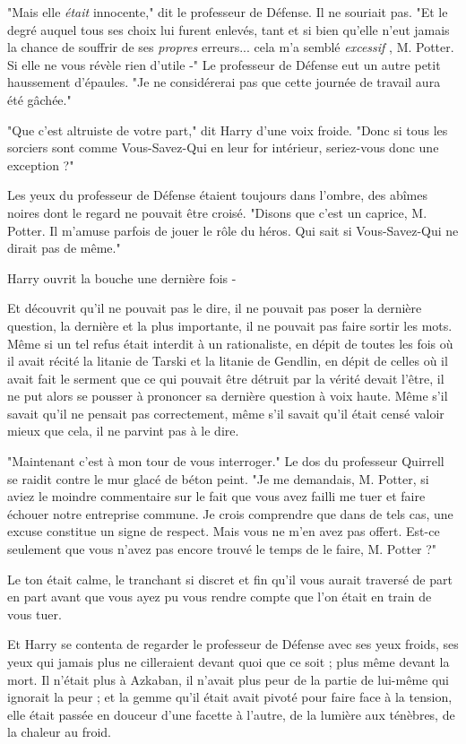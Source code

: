 "Mais elle \emph{était}  innocente," dit le professeur de Défense. Il ne souriait pas. "Et le degré auquel tous ses choix lui furent enlevés, tant et si bien qu'elle n'eut jamais la chance de souffrir de ses \emph{propres}  erreurs... cela m'a semblé \emph{excessif} , M. Potter. Si elle ne vous révèle rien d'utile -" Le professeur de Défense eut un autre petit haussement d'épaules. "Je ne considérerai pas que cette journée de travail aura été gâchée."

"Que c'est altruiste de votre part," dit Harry d'une voix froide. "Donc si tous les sorciers sont comme Vous-Savez-Qui en leur for intérieur, seriez-vous donc une exception ?"

Les yeux du professeur de Défense étaient toujours dans l'ombre, des abîmes noires dont le regard ne pouvait être croisé. "Disons que c'est un caprice, M. Potter. Il m'amuse parfois de jouer le rôle du héros. Qui sait si Vous-Savez-Qui ne dirait pas de même."

Harry ouvrit la bouche une dernière fois -

Et découvrit qu'il ne pouvait pas le dire, il ne pouvait pas poser la dernière question, la dernière et la plus importante, il ne pouvait pas faire sortir les mots. Même si un tel refus était interdit à un rationaliste, en dépit de toutes les fois où il avait récité la litanie de Tarski et la litanie de Gendlin, en dépit de celles où il avait fait le serment que ce qui pouvait être détruit par la vérité devait l'être, il ne put alors se pousser à prononcer sa dernière question à voix haute. Même s'il savait qu'il ne pensait pas correctement, même s'il savait qu'il était censé valoir mieux que cela, il ne parvint pas à le dire.

"Maintenant c'est à mon tour de vous interroger." Le dos du professeur Quirrell se raidit contre le mur glacé de béton peint. "Je me demandais, M. Potter, si aviez le moindre commentaire sur le fait que vous avez failli me tuer et faire échouer notre entreprise commune. Je crois comprendre que dans de tels cas, une excuse constitue un signe de respect. Mais vous ne m'en avez pas offert. Est-ce seulement que vous n'avez pas encore trouvé le temps de le faire, M. Potter ?"

Le ton était calme, le tranchant si discret et fin qu'il vous aurait traversé de part en part avant que vous ayez pu vous rendre compte que l'on était en train de vous tuer.

Et Harry se contenta de regarder le professeur de Défense avec ses yeux froids, ses yeux qui jamais plus ne cilleraient devant quoi que ce soit ; plus même devant la mort. Il n'était plus à Azkaban, il n'avait plus peur de la partie de lui-même qui ignorait la peur ; et la gemme qu'il était avait pivoté pour faire face à la tension, elle était passée en douceur d'une facette à l'autre, de la lumière aux ténèbres, de la chaleur au froid.

